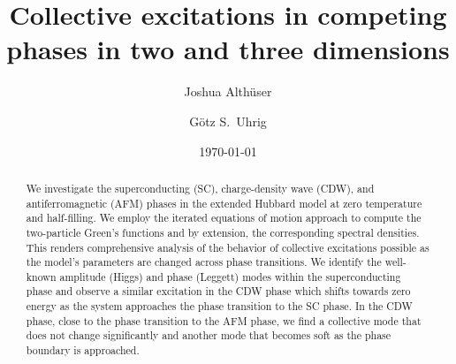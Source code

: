 \documentclass[
    reprint, 
    aps,
    preprintnumbers,
    twocolumn,
    prb,
    superscriptaddress
]{revtex4-2}
\begin{document}
 

\title{Collective excitations in competing phases in two and three dimensions}


\author{Joshua Alth\"user}

\author{G\"otz S.~Uhrig}

\date{\today}

\begin{abstract}
    We investigate the superconducting (SC), charge-density wave (CDW), and antiferromagnetic (AFM) phases 
    in the extended Hubbard model at zero temperature and half-filling.
    We employ the iterated equations of motion approach \cite{Kalthoff17,bleicker18} to compute the two-particle Green's functions and by extension, the corresponding spectral densities.
    This renders comprehensive analysis of the behavior of collective excitations possible as the model's parameters are changed across phase transitions.
    We identify the well-known amplitude (Higgs) and phase (Leggett) modes within the superconducting phase and observe a similar excitation in the CDW phase which shifts towards zero energy as the system approaches the phase transition to the SC phase.
    In the CDW phase, close to the phase transition to the AFM phase, we find a collective mode that does not change significantly and another mode that becomes soft as the phase boundary is approached.
\end{abstract}

\maketitle
\end{document}
